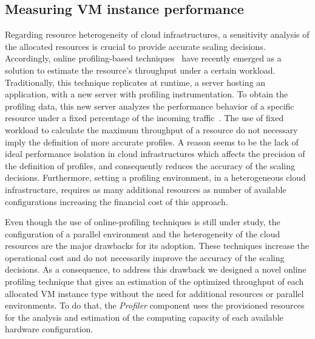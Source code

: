 



\subsection{Measuring VM instance performance \label{profiling}}

Regarding resource heterogeneity of cloud infrastructures, a sensitivity analysis of the allocated resources is crucial to provide accurate scaling decisions. Accordingly, online profiling-based techniques~\cite{kaviani_profiling-as--service:_2011} have recently emerged as a solution to  estimate the resource's throughput under a certain workload. Traditionally, this technique replicates at runtime, a server hosting an application, with a new server with profiling instrumentation. To obtain  the profiling data, this new server analyzes the performance behavior of a specific resource under a fixed percentage of the incoming traffic~\cite{dejavu2012,jiangThesis}. The use of fixed workload to calculate the maximum throughput of a resource do not necessary imply the definition of more accurate profiles. A reason seems to be the lack of ideal performance isolation in cloud infrastructures which affects the precision of the definition of profiles, and consequently reduces the accuracy of the scaling decisions. Furthermore, setting a profiling environment, in a heterogeneous cloud infrastructure, requires as many additional resources as number of available configurations increasing the financial cost of this approach. 

Even though the use of online-profiling techniques is still under study, the configuration of a parallel environment and the heterogeneity of the cloud resources are the major drawbacks for its adoption. These techniques increase the operational cost and do not necessarily improve the accuracy of the scaling decisions. As a consequence, to address this drawback we designed a novel online profiling technique that gives an estimation of the optimized throughput of each allocated VM instance type without the need for additional resources or parallel environments. To do that, the \emph{Profiler} component uses the provisioned resources for the analysis and estimation of the computing capacity of each available hardware configuration.

